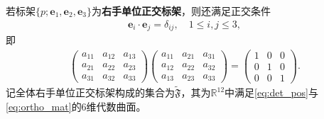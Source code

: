 \documentclass[../../main.tex]{subfiles}%
\begin{document}
\begin{definition}
若标架$\{p;\boldsymbol{e}_1,\boldsymbol{e}_2,\boldsymbol{e}_3\}$为\textbf{右手单位正交标架}，则还满足正交条件
\begin{align}
\boldsymbol{e}_i\cdot\boldsymbol{e}_j=\delta_{ij},\quad 1\leqslant i,j\leqslant3,
\label{eq:ortho_cond}
\end{align}
即
\begin{align}
\begin{pmatrix}
a_{11} & a_{12} & a_{13}\\
a_{21} & a_{22} & a_{23}\\
a_{31} & a_{32} & a_{33}
\end{pmatrix}
\begin{pmatrix}
a_{11} & a_{21} & a_{31}\\
a_{12} & a_{22} & a_{32}\\
a_{13} & a_{23} & a_{33}
\end{pmatrix}
=
\begin{pmatrix}
1 & 0 & 0\\
0 & 1 & 0\\
0 & 0 & 1
\end{pmatrix}.
\label{eq:ortho_mat}
\end{align}
记全体右手单位正交标架构成的集合为$\tilde{\mathfrak{F}}$，其为$\mathbb{R}^{12}$中满足\eqref{eq:det_pos}与\eqref{eq:ortho_mat}的6维代数曲面。
\end{definition}
\end{document}
